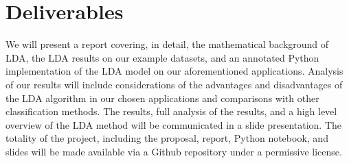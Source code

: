 \documentclass[letterpaper, 10 pt, conference]{ieeeconf}  %
\begin{document}
\section{Deliverables} 
We will present a report covering, in detail, the mathematical background of LDA, the LDA results on our example datasets, and an annotated Python implementation of the LDA model on our aforementioned applications. Analysis of our results will include considerations of the advantages and disadvantages of the LDA algorithm in our chosen applications and comparisons with other classification methods. The results, full analysis of the results, and a high level overview of the LDA method will be communicated in a slide presentation. The totality of the project, including the proposal, report, Python notebook, and slides will be made available via a Github repository under a permissive license.






\end{document}
